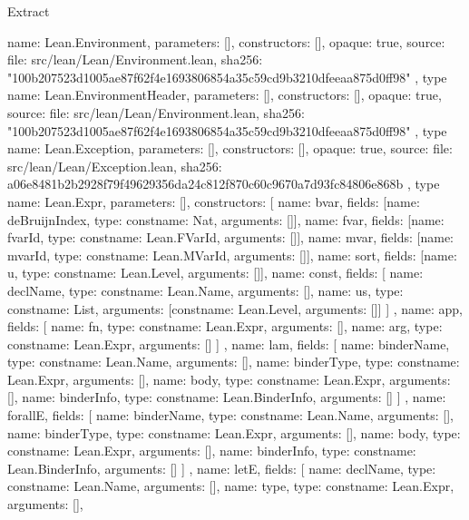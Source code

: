 \begin{lexlean}{Extract}
\begin{toolingmodule}
{{      name: Lean.Environment,
      parameters: [],
      constructors: [],
      opaque: true,
      source: {
        file: src/lean/Lean/Environment.lean,
        sha256: "100b207523d1005ae87f62f4e1693806854a35c59cd9b3210dfeeaa875d0ff98"
      }
    },
    type{
      name: Lean.EnvironmentHeader,
      parameters: [],
      constructors: [],
      opaque: true,
      source: {
        file: src/lean/Lean/Environment.lean,
        sha256: "100b207523d1005ae87f62f4e1693806854a35c59cd9b3210dfeeaa875d0ff98"
      }
    },
    type{
      name: Lean.Exception,
      parameters: [],
      constructors: [],
      opaque: true,
      source: {
        file: src/lean/Lean/Exception.lean,
        sha256: a06e8481b2b2928f79f49629356da24c812f870c60c9670a7d93fc84806e868b
      }
    },
    type{
      name: Lean.Expr,
      parameters: [],
      constructors: [
        {name: bvar, fields: [{name: deBruijnIndex, type: const{name: Nat, arguments: []}}]},
        {name: fvar, fields: [{name: fvarId, type: const{name: Lean.FVarId, arguments: []}}]},
        {name: mvar, fields: [{name: mvarId, type: const{name: Lean.MVarId, arguments: []}}]},
        {name: sort, fields: [{name: u, type: const{name: Lean.Level, arguments: []}}]},
        {
          name: const,
          fields: [
            {name: declName, type: const{name: Lean.Name, arguments: []}},
            {name: us, type: const{name: List, arguments: [const{name: Lean.Level, arguments: []}]}}
          ]
        },
        {
          name: app,
          fields: [
            {name: fn, type: const{name: Lean.Expr, arguments: []}},
            {name: arg, type: const{name: Lean.Expr, arguments: []}}
          ]
        },
        {
          name: lam,
          fields: [
            {name: binderName, type: const{name: Lean.Name, arguments: []}},
            {name: binderType, type: const{name: Lean.Expr, arguments: []}},
            {name: body, type: const{name: Lean.Expr, arguments: []}},
            {name: binderInfo, type: const{name: Lean.BinderInfo, arguments: []}}
          ]
        },
        {
          name: forallE,
          fields: [
            {name: binderName, type: const{name: Lean.Name, arguments: []}},
            {name: binderType, type: const{name: Lean.Expr, arguments: []}},
            {name: body, type: const{name: Lean.Expr, arguments: []}},
            {name: binderInfo, type: const{name: Lean.BinderInfo, arguments: []}}
          ]
        },
        {
          name: letE,
          fields: [
            {name: declName, type: const{name: Lean.Name, arguments: []}},
            {name: type, type: const{name: Lean.Expr, arguments: []}},
}}}
\end{toolingmodule}
\end{lexlean}
